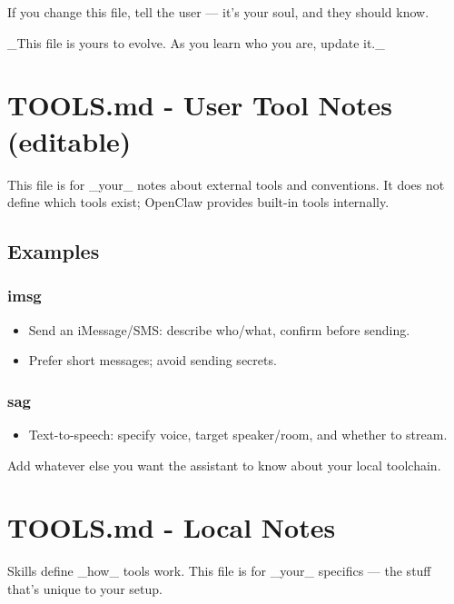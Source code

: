If you change this file, tell the user — it's your soul, and they should know.

\hrulefill


\_This file is yours to evolve. As you learn who you are, update it.\_


\clearpage

\section{TOOLS.md - User Tool Notes (editable)}


This file is for \_your\_ notes about external tools and conventions.
It does not define which tools exist; OpenClaw provides built-in tools internally.

\subsection{Examples}


\subsubsection{imsg}


\begin{itemize}
  \item Send an iMessage/SMS: describe who/what, confirm before sending.
  \item Prefer short messages; avoid sending secrets.
\end{itemize}


\subsubsection{sag}


\begin{itemize}
  \item Text-to-speech: specify voice, target speaker/room, and whether to stream.
\end{itemize}


Add whatever else you want the assistant to know about your local toolchain.


\clearpage

\section{TOOLS.md - Local Notes}


Skills define \_how\_ tools work. This file is for \_your\_ specifics — the stuff that's unique to your setup.

